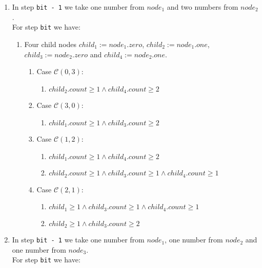 \begin{enumerate}
    \item In step \texttt{bit - 1} we take one number from $node_{1}$ and two numbers from $node_{2}$.\\
        For step \texttt{bit} we have:
         \begin{enumerate}
            \item Four child nodes $child_{1} := node_{1}.zero$, $child_{2} := node_{1}.one$, $child_{3} := node_{2}.zero$ and $child_{4} := node_{2}.one$.
            \begin{enumerate}
                \item Case $\mathcal{C}\left(0,3\right)$:
                    \begin{enumerate}
                        \item $child_{2}.count \geq 1 \wedge child_{4}.count \geq 2$
                    \end{enumerate}
                \item Case $\mathcal{C}\left(3,0\right)$:
                    \begin{enumerate}
                        \item $child_{1}.count \geq 1 \wedge child_{3}.count \geq 2$
                    \end{enumerate}
        
                \item Case $\mathcal{C}\left(1,2\right)$:
                    \begin{enumerate}
                        \item $child_{1}.count \geq 1 \wedge child_{4}.count \geq 2$
                        \item $child_{2}.count \geq 1 \wedge child_{3}.count \geq 1 \wedge child_{4}.count \geq 1$
                    \end{enumerate}
                \item Case $\mathcal{C}\left(2,1\right)$:
                    \begin{enumerate}
                        \item $child_{1} \geq 1 \wedge child_{3}.count \geq 1 \wedge child_{4}.count \geq 1$
                        \item $child_{2} \geq 1 \wedge child_{3}.count \geq 2$
                    \end{enumerate}
            \end{enumerate}
        \end{enumerate}
    
    \item In step \texttt{bit - 1} we take one number from $node_{1}$, one number from $node_{2}$ and one number from $node_{3}$.\\
        For step \texttt{bit} we have:


\end{enumerate}
